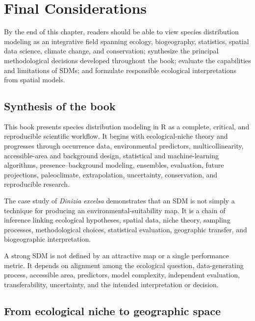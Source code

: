 \chapter[Final considerations]{Final Considerations}

\begin{objetivos}
By the end of this chapter, readers should be able to view species distribution modeling as an integrative field spanning ecology, biogeography, statistics, spatial data science, climate change, and conservation; synthesize the principal methodological decisions developed throughout the book; evaluate the capabilities and limitations of SDMs; and formulate responsible ecological interpretations from spatial models.
\end{objetivos}

\section{Synthesis of the book}

This book presents species distribution modeling in R as a complete, critical, and reproducible scientific workflow. It begins with ecological-niche theory and progresses through occurrence data, environmental predictors, multicollinearity, accessible-area and background design, statistical and machine-learning algorithms, presence--background modeling, ensembles, evaluation, future projections, paleoclimate, extrapolation, uncertainty, conservation, and reproducible research.

The case study of \textit{Dinizia excelsa} demonstrates that an SDM is not simply a technique for producing an environmental-suitability map. It is a chain of inference linking ecological hypotheses, spatial data, niche theory, sampling processes, methodological choices, statistical evaluation, geographic transfer, and biogeographic interpretation.

\begin{conceito}[title={\faBook\quad Central message}]
A strong SDM is not defined by an attractive map or a single performance metric. It depends on alignment among the ecological question, data-generating process, accessible area, predictors, model complexity, independent evaluation, transferability, uncertainty, and the intended interpretation or decision.
\end{conceito}

\section{From ecological niche to geographic space}

